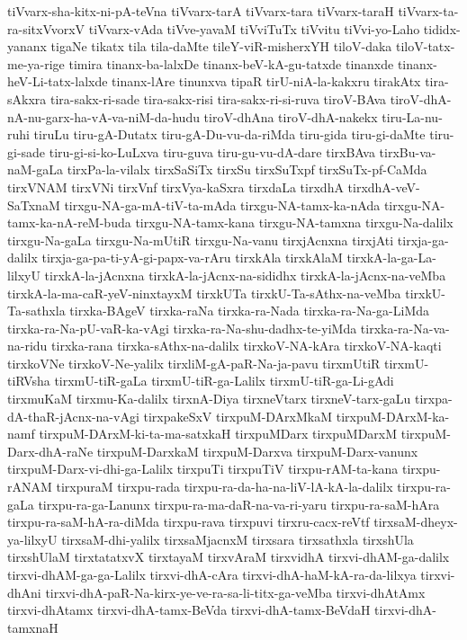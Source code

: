{tiVvarx-sha-kitx-ni-pA-teVna
tiVvarx-tarA
tiVvarx-tara
tiVvarx-taraH
tiVvarx-ta-ra-sitxVvorxV
tiVvarx-vAda
tiVve-yavaM
tiVviTuTx
tiVvitu
tiVvi-yo-Laho
tididx-yananx
tigaNe
tikatx
tila
tila-daMte
tileY-viR-misherxYH
tiloV-daka
tiloV-tatx-me-ya-rige
timira
tinanx-ba-lalxDe
tinanx-beV-kA-gu-tatxde
tinanxde
tinanx-heV-Li-tatx-lalxde
tinanx-lAre
tinunxva
tipaR
tirU-niA-la-kakxru
tirakAtx
tira-sAkxra
tira-sakx-ri-sade
tira-sakx-risi
tira-sakx-ri-si-ruva
tiroV-BAva
tiroV-dhA-nA-nu-garx-ha-vA-va-niM-da-hudu
tiroV-dhAna
tiroV-dhA-nakekx
tiru-La-nu-ruhi
tiruLu
tiru-gA-Dutatx
tiru-gA-Du-vu-da-riMda
tiru-gida
tiru-gi-daMte
tiru-gi-sade
tiru-gi-si-ko-LuLxva
tiru-guva
tiru-gu-vu-dA-dare
tirxBAva
tirxBu-va-naM-gaLa
tirxPa-la-vilalx
tirxSaSiTx
tirxSu
tirxSuTxpf
tirxSuTx-pf-CaMda
tirxVNAM
tirxVNi
tirxVnf
tirxVya-kaSxra
tirxdaLa
tirxdhA
tirxdhA-veV-SaTxnaM
tirxgu-NA-ga-mA-tiV-ta-mAda
tirxgu-NA-tamx-ka-nAda
tirxgu-NA-tamx-ka-nA-reM-buda
tirxgu-NA-tamx-kana
tirxgu-NA-tamxna
tirxgu-Na-dalilx
tirxgu-Na-gaLa
tirxgu-Na-mUtiR
tirxgu-Na-vanu
tirxjAcnxna
tirxjAti
tirxja-ga-dalilx
tirxja-ga-pa-ti-yA-gi-papx-va-rAru
tirxkAla
tirxkAlaM
tirxkA-la-ga-La-lilxyU
tirxkA-la-jAcnxna
tirxkA-la-jAcnx-na-sididhx
tirxkA-la-jAcnx-na-veMba
tirxkA-la-ma-caR-yeV-ninxtayxM
tirxkUTa
tirxkU-Ta-sAthx-na-veMba
tirxkU-Ta-sathxla
tirxka-BAgeV
tirxka-raNa
tirxka-ra-Nada
tirxka-ra-Na-ga-LiMda
tirxka-ra-Na-pU-vaR-ka-vAgi
tirxka-ra-Na-shu-dadhx-te-yiMda
tirxka-ra-Na-va-na-ridu
tirxka-rana
tirxka-sAthx-na-dalilx
tirxkoV-NA-kAra
tirxkoV-NA-kaqti
tirxkoVNe
tirxkoV-Ne-yalilx
tirxliM-gA-paR-Na-ja-pavu
tirxmUtiR
tirxmU-tiRVsha
tirxmU-tiR-gaLa
tirxmU-tiR-ga-Lalilx
tirxmU-tiR-ga-Li-gAdi
tirxmuKaM
tirxmu-Ka-dalilx
tirxnA-Diya
tirxneVtarx
tirxneV-tarx-gaLu
tirxpa-dA-thaR-jAcnx-na-vAgi
tirxpakeSxV
tirxpuM-DArxMkaM
tirxpuM-DArxM-ka-namf
tirxpuM-DArxM-ki-ta-ma-satxkaH
tirxpuMDarx
tirxpuMDarxM
tirxpuM-Darx-dhA-raNe
tirxpuM-DarxkaM
tirxpuM-Darxva
tirxpuM-Darx-vanunx
tirxpuM-Darx-vi-dhi-ga-Lalilx
tirxpuTi
tirxpuTiV
tirxpu-rAM-ta-kana
tirxpu-rANAM
tirxpuraM
tirxpu-rada
tirxpu-ra-da-ha-na-liV-lA-kA-la-dalilx
tirxpu-ra-gaLa
tirxpu-ra-ga-Lanunx
tirxpu-ra-ma-daR-na-va-ri-yaru
tirxpu-ra-saM-hAra
tirxpu-ra-saM-hA-ra-diMda
tirxpu-rava
tirxpuvi
tirxru-cacx-reVtf
tirxsaM-dheyx-ya-lilxyU
tirxsaM-dhi-yalilx
tirxsaMjacnxM
tirxsara
tirxsathxla
tirxshUla
tirxshUlaM
tirxtatatxvX
tirxtayaM
tirxvAraM
tirxvidhA
tirxvi-dhAM-ga-dalilx
tirxvi-dhAM-ga-ga-Lalilx
tirxvi-dhA-cAra
tirxvi-dhA-haM-kA-ra-da-lilxya
tirxvi-dhAni
tirxvi-dhA-paR-Na-kirx-ye-ve-ra-sa-li-titx-ga-veMba
tirxvi-dhAtAmx
tirxvi-dhAtamx
tirxvi-dhA-tamx-BeVda
tirxvi-dhA-tamx-BeVdaH
tirxvi-dhA-tamxnaH
}
